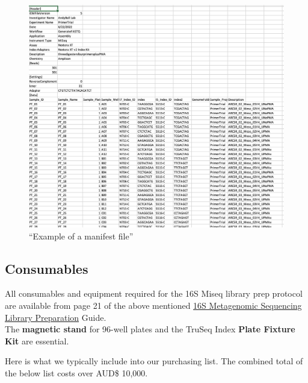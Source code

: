 \documentclass[
]{book}
\begin{document}
\begin{figure}
\centering
\includegraphics{./img/manifestfile.png}
\caption{``Example of a manifest file''}
\end{figure}

\hypertarget{consumables}{%
\subsection{Consumables}\label{consumables}}

All consumables and equipment required for the 16S Miseq library prep protocol are available from page 21 of the above mentioned \href{https://sapac.support.illumina.com/content/dam/illumina-support/documents/documentation/chemistry_documentation/16s/16s-metagenomic-library-prep-guide-15044223-b.pdf}{16S Metagenomic Sequencing Library
Preparation} Guide.\\
The \textbf{magnetic stand} for 96-well plates and the TruSeq Index \textbf{Plate Fixture Kit} are essential.

Here is what we typically include into our purchasing list. The combined total of the below list costs over AUD\$ 10,000.
\end{document}

